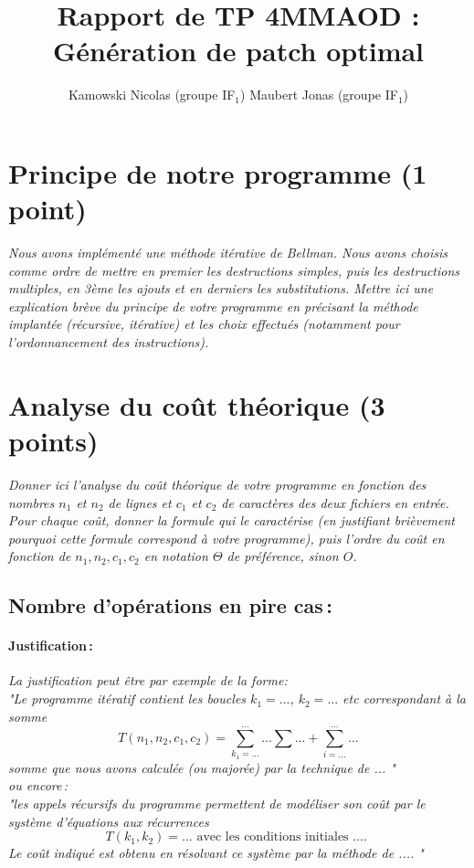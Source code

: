 \documentclass[a4paper, 10pt, french]{article}
\title{Rapport de TP 4MMAOD : Génération de patch optimal}
\author{
Kamowski Nicolas  (groupe IF$_1$) 
Maubert Jonas  (groupe IF$_1$) 
}
\begin{document}
\maketitle


\section{Principe de notre  programme (1 point)}
{\em Nous avons implémenté une méthode itérative de Bellman.
Nous avons choisis comme ordre de mettre en premier les destructions simples, puis les destructions multiples, en 3ème les ajouts et en derniers les substitutions. 
 Mettre ici une explication brève du principe de votre programme en  précisant la méthode implantée (récursive, itérative) et les
choix effectués (notamment pour l'ordonnancement des instructions).
} 

\section{Analyse du coût théorique (3 points)}
{\em Donner ici l'analyse du coût théorique de votre programme en fonction des nombres $n_1$ et $n_2$ de lignes 
et $c_1$ et $c_2$ de caractères des deux fichiers en entrée.
 Pour chaque coût, donner la formule qui le caractérise (en justifiant brièvement pourquoi cette formule correspond à votre programme), 
 puis l'ordre du coût en fonction de $n_1, n_2, c_1, c_2$ en notation $\Theta$ de préférence, sinon $O$.}

  \subsection{Nombre  d'opérations en pire cas\,: }
    \paragraph{Justification\,: }
    {\em La justification peut être par exemple de la forme: \\ 
       "Le programme itératif contient les boucles $k_1=...$, $k_2= ...$ etc correspondant à la somme 
      $$T(n_1, n_2, c_1, c_2) = \sum_{k_1=...}^{...} ... \sum ... + \sum_{i=...}^{...} ...$$ 
      somme que nous avons calculée (ou majorée) par la technique de  ... " \\
      ou  encore\,:  \\
      "les appels récursifs du programme permettent de modéliser son coût par le système d'équations aux récurrences 
      $$T(k_1, k_2) = ...  \mbox{~avec~les~conditions~initiales~....~} $$
      Le coût indiqué est obtenu en résolvant ce système par la méthode de  .... "
    } 
\end{document}
